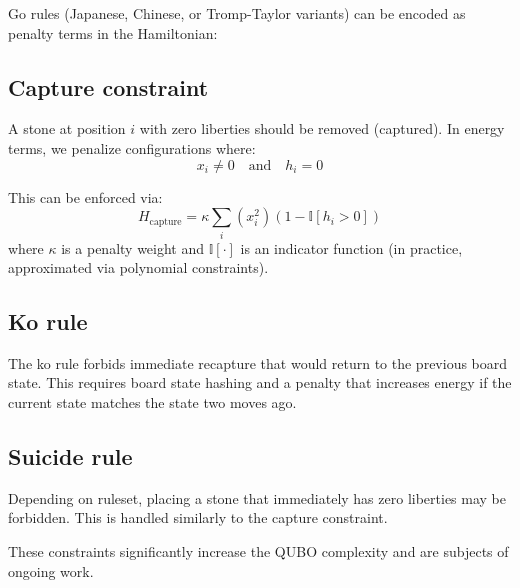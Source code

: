 \documentclass[aps,prl,reprint]{revtex4-2}
\begin{document}
Go rules (Japanese, Chinese, or Tromp-Taylor variants) can be encoded as penalty terms in the Hamiltonian:

\subsection{Capture constraint}

A stone at position $i$ with zero liberties should be removed (captured). In energy terms, we penalize configurations where:
\begin{equation}
x_i \neq 0 \quad \text{and} \quad h_i = 0
\end{equation}

This can be enforced via:
\begin{equation}
H_{\text{capture}} = \kappa \sum_i (x_i^2)(1 - \mathbb{I}[h_i > 0])
\end{equation}
where $\kappa$ is a penalty weight and $\mathbb{I}[\cdot]$ is an indicator function (in practice, approximated via polynomial constraints).

\subsection{Ko rule}

The ko rule forbids immediate recapture that would return to the previous board state. This requires board state hashing and a penalty that increases energy if the current state matches the state two moves ago.

\subsection{Suicide rule}

Depending on ruleset, placing a stone that immediately has zero liberties may be forbidden. This is handled similarly to the capture constraint.

These constraints significantly increase the QUBO complexity and are subjects of ongoing work.
\end{document}
